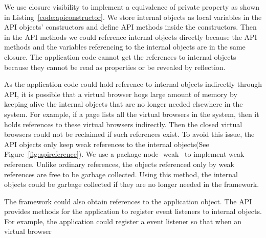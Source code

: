 We use closure visibility to implement a equivalence of private property as
shown in Listing~\ref{code:apiconstructor}. We store internal objects as local
variables in the API objects' constructors and define API methods inside the
constructors. Then in the API methods we could reference internal objects
directly because the API methods and the variables referencing to the internal
objects are in the same closure. The application code cannot get the
references to internal objects because they cannot be read as properties or be
revealed by reflection.




As the application code could hold reference to internal objects indirectly
through API, it is possible that a virtual browser hogs large amount of memory
by keeping alive the internal objects that are no longer needed elsewhere in
the system.  For example, if a page lists all the virtual browsers in the
system, then it holds references to these virtual browsers indirectly. Then
the closed virtual browsers could not be reclaimed if such references exist.
To avoid this issue, the API objects only keep weak references to the internal
objects(See Figure~\ref{fig:apireference}). We use a \nodejs{} package node-
weak~\cite{nodeweak} to implement weak reference. Unlike ordinary references,
the objects referenced only by weak references are free to be garbage
collected. Using this method, the internal objects could be garbage collected
if they are no longer needed in the framework.


\apireferencefig{}

The framework could also obtain references to the application object. 
The API provides methods for the application to register event listeners to
internal objects.
For example,
the application could register a event listener so that when an virtual browser
